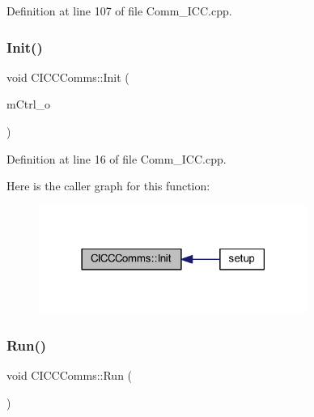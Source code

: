 Definition at line 107 of file Comm\+\_\+\+I\+C\+C.\+cpp.

\mbox{\label{class_c_i_c_c_comms_a56fc0858965ed1f1f9b3295602472c7e}} 
\subsubsection{\texorpdfstring{Init()}{Init()}}
{\footnotesize\ttfamily void C\+I\+C\+C\+Comms\+::\+Init (\begin{DoxyParamCaption}\item[{\mbox{\hyperlink{class_c_motor_ctrl}{C\+Motor\+Ctrl}} $\ast$}]{m\+Ctrl\+\_\+o }\end{DoxyParamCaption})\hspace{0.3cm}{\ttfamily [virtual]}}



Definition at line 16 of file Comm\+\_\+\+I\+C\+C.\+cpp.

Here is the caller graph for this function\+:
\nopagebreak
\begin{figure}[H]
\begin{center}
\leavevmode
\includegraphics[width=249pt]{class_c_i_c_c_comms_a56fc0858965ed1f1f9b3295602472c7e_icgraph}
\end{center}
\end{figure}
\mbox{\label{class_c_i_c_c_comms_a8b3fa81307b3b9ba0e72b4aee8279c56}} 
\subsubsection{\texorpdfstring{Run()}{Run()}}
{\footnotesize\ttfamily void C\+I\+C\+C\+Comms\+::\+Run (\begin{DoxyParamCaption}\item[{void}]{ }\end{DoxyParamCaption})\hspace{0.3cm}{\ttfamily [virtual]}}



